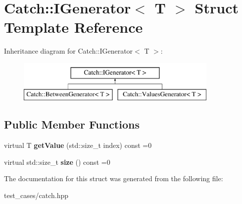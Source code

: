 \hypertarget{structCatch_1_1IGenerator}{}\section{Catch\+:\+:I\+Generator$<$ T $>$ Struct Template Reference}
\label{structCatch_1_1IGenerator}
Inheritance diagram for Catch\+:\+:I\+Generator$<$ T $>$\+:\begin{figure}[H]
\begin{center}
\leavevmode
\includegraphics[height=2.000000cm]{structCatch_1_1IGenerator}
\end{center}
\end{figure}
\subsection*{Public Member Functions}
\begin{DoxyCompactItemize}
\item 
\mbox{\label{structCatch_1_1IGenerator_ad69e937cb66dba3ed9429c42abf4fce3}} 
virtual T {\bfseries get\+Value} (std\+::size\+\_\+t index) const =0
\item 
\mbox{\label{structCatch_1_1IGenerator_a2e317253b03e838b6065ce69719a198e}} 
virtual std\+::size\+\_\+t {\bfseries size} () const =0
\end{DoxyCompactItemize}


The documentation for this struct was generated from the following file\+:\begin{DoxyCompactItemize}
\item 
test\+\_\+cases/catch.\+hpp\end{DoxyCompactItemize}
